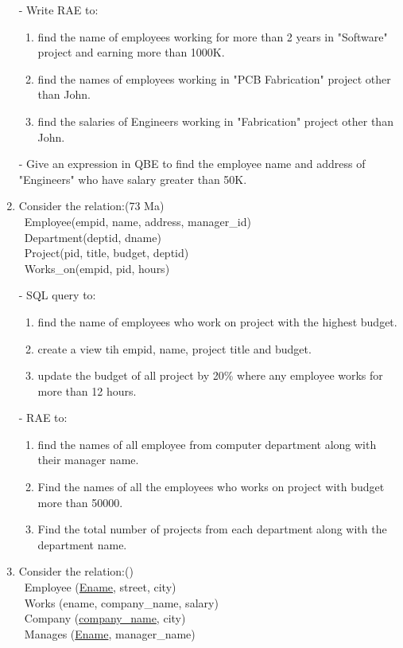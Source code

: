 \documentclass[12pt]{article}
\newcommand{\enter}{\\\textcolor{white}{1}}
\begin{document}
\begin{enumerate}
        - Write RAE to:
        \begin{enumerate}[noitemsep, topsep = 0pt, label = \alph*.]
            \item find the name of employees working for more than 2 years in "Software" project and earning more than 1000K.
            \item find the names of employees working in "PCB Fabrication" project other than John.
            \item find the salaries of Engineers working in "Fabrication" project other than John.
        \end{enumerate}
        
        - Give an expression in QBE to find the employee name and address of "Engineers" who have salary greater than 50K.

    \item Consider the relation:\hfill(73 Ma)
        \enter Employee(empid, name, address, manager\_id)
        \enter Department(deptid, dname)
        \enter Project(pid, title, budget, deptid)
        \enter Works\_on(empid, pid, hours)

        - SQL query to:
            \begin{enumerate}[noitemsep, topsep = 0pt, label = \alph*.]
            \item find the name of employees who work on project with the highest budget.
            \item create a view tih empid, name, project title and budget.
            \item update the budget of all project by 20\% where any employee works for more than 12 hours.
        \end{enumerate}

        - RAE to:
        \begin{enumerate}[noitemsep, topsep = 0pt, label = \alph*.]
            \item find the names of all employee from computer department along with their manager name.
            \item Find the names of all the employees who works on project with budget more than 50000.
            \item Find the total number of projects from each department along with the department name.
        \end{enumerate}

    \item Consider the relation:\hfill()
        \enter Employee (\underline{Ename}, street, city)
        \enter Works (ename, company\_name, salary)
        \enter Company (\underline{company\_name}, city)
        \enter Manages (\underline{Ename}, manager\_name)


\end{enumerate}
\end{document}
